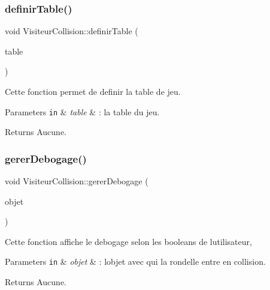 \subsubsection{\texorpdfstring{definir\+Table()}{definirTable()}}
{\footnotesize\ttfamily void Visiteur\+Collision\+::definir\+Table (\begin{DoxyParamCaption}\item[{\hyperlink{class_noeud_table}{Noeud\+Table} $\ast$}]{table }\end{DoxyParamCaption})}

Cette fonction permet de definir la table de jeu.


\begin{DoxyParams}[1]{Parameters}
\mbox{\tt in}  & {\em table} & \+: la table du jeu.\\
\hline
\end{DoxyParams}
\begin{DoxyReturn}{Returns}
Aucune. 
\end{DoxyReturn}
\hypertarget{class_visiteur_collision_ab67aed0a6f062c2350eb6acc86f83508}{}\label{class_visiteur_collision_ab67aed0a6f062c2350eb6acc86f83508} 
\subsubsection{\texorpdfstring{gerer\+Debogage()}{gererDebogage()}}
{\footnotesize\ttfamily void Visiteur\+Collision\+::gerer\+Debogage (\begin{DoxyParamCaption}\item[{string}]{objet }\end{DoxyParamCaption})}

Cette fonction affiche le debogage selon les booleans de l\textquotesingle{}utilisateur,


\begin{DoxyParams}[1]{Parameters}
\mbox{\tt in}  & {\em objet} & \+: l\textquotesingle{}objet avec qui la rondelle entre en collision.\\
\hline
\end{DoxyParams}
\begin{DoxyReturn}{Returns}
Aucune. 
\end{DoxyReturn}
\hypertarget{class_visiteur_collision_a13802f6045d791037e456906fa19a9ba}{}\label{class_visiteur_collision_a13802f6045d791037e456906fa19a9ba} 
